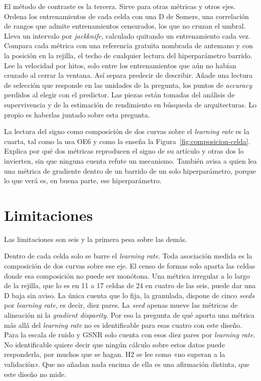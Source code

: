 El método de contraste es la tercera. Sirve para otras métricas y otros ejes. Ordena los entrenamientos de cada celda con una D de Somers, una correlación de rangos que admite entrenamientos censurados, los que no cruzan el umbral. Lleva un intervalo por \emph{jackknife}, calculado quitando un entrenamiento cada vez. Compara cada métrica con una referencia gratuita nombrada de antemano y con la posición en la rejilla, el techo de cualquier lectura del hiperparámetro barrido. Lee la velocidad por hitos, solo entre los entrenamientos que aún no habían cruzado al cerrar la ventana. Así separa predecir de describir. Añade una lectura de selección que responde en las unidades de la pregunta, los puntos de \emph{accuracy} perdidos al elegir con el predictor. Las piezas están tomadas del análisis de supervivencia y de la estimación de rendimiento en búsqueda de arquitecturas. Lo propio es haberlas juntado sobre esta pregunta.

La lectura del signo como composición de dos curvas sobre el \emph{learning rate} es la cuarta, tal como la usa OE6 y como la enseña la Figura~\ref{fig:composicion-celda}. Explica por qué dos métricas reproducen el signo de su artículo y otras dos lo invierten, sin que ninguna cuenta refute un mecanismo. También avisa a quien lea una métrica de gradiente dentro de un barrido de un solo hiperparámetro, porque lo que verá es, en buena parte, ese hiperparámetro.

\section{Limitaciones}
\label{sec:concl-limitaciones}

Las limitaciones son seis y la primera pesa sobre las demás.

Dentro de cada celda solo se barre el \emph{learning rate}. Toda asociación medida es la composición de dos curvas sobre ese eje. El censo de formas solo aparta las celdas donde esa composición no puede ser monótona. Una métrica irregular a lo largo de la rejilla, que lo es en 11 a 17 celdas de 24 en cuatro de las seis, puede dar una D baja sin aviso. La única cuenta que lo fija, la granulada, dispone de cinco \emph{seeds} por \emph{learning rate}, es decir, diez pares. La \emph{seed} apenas mueve las métricas de alineación ni la \emph{gradient disparity}. Por eso la pregunta de qué aporta una métrica más allá del \emph{learning rate} no es identificable para esas cuatro con este diseño. Para la escala de ruido y GSNR solo cuenta con esos diez pares por \emph{learning rate}. No identificable quiere decir que ningún cálculo sobre estos datos puede responderla, por muchos que se hagan. H2 se lee como «no superan a la validación». Que no añadan nada encima de ella es una afirmación distinta, que este diseño no mide.

